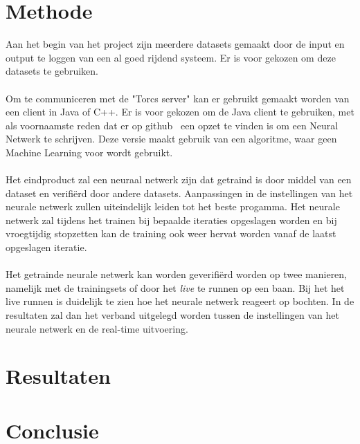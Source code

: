 \documentclass{article}
\begin{document}
\section{Methode}
Aan het begin van het project zijn meerdere datasets gemaakt door de input en output te loggen van een al goed rijdend systeem. Er is voor gekozen om deze datasets te gebruiken. \\\\ 
Om te communiceren met de "Torcs server" kan er gebruikt gemaakt worden van een client in Java of C++. Er is voor gekozen om de Java client te gebruiken, met als voornaamste reden dat er op github~\cite{java-client} een opzet te vinden is om een Neural Netwerk te schrijven. Deze versie maakt gebruik van een algoritme, waar geen Machine Learning voor wordt gebruikt. \\\\
Het eindproduct zal een neuraal netwerk zijn dat getraind is door middel van een dataset en verifi\"erd door andere datasets. Aanpassingen in de instellingen van het neurale netwerk zullen uiteindelijk leiden tot het beste progamma. Het neurale netwerk zal tijdens het trainen bij bepaalde iteraties opgeslagen worden en bij vroegtijdig stopzetten kan de training ook weer hervat worden vanaf de laatst opgeslagen iteratie. \\\\
Het getrainde neurale netwerk kan worden geverifi\"erd worden op twee manieren, namelijk met de trainingsets of door het \textit{live} te runnen op een baan. Bij het het live runnen is duidelijk te zien hoe het neurale netwerk reageert op bochten. In de resultaten zal dan het verband uitgelegd worden tussen de instellingen van het neurale netwerk en de real-time uitvoering. 

\section{Resultaten}

\section{Conclusie}

\newpage


%

\end{document}
